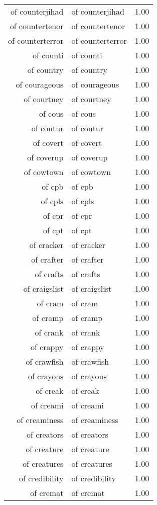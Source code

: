 \begin{table}[ht]
\begin{tabular}{rlr}
  of counterjihad & of counterjihad & 1.00 \\ 
  of countertenor & of countertenor & 1.00 \\ 
  of counterterror & of counterterror & 1.00 \\ 
  of counti & of counti & 1.00 \\ 
  of country & of country & 1.00 \\ 
  of courageous & of courageous & 1.00 \\ 
  of courtney & of courtney & 1.00 \\ 
  of cous & of cous & 1.00 \\ 
  of coutur & of coutur & 1.00 \\ 
  of covert & of covert & 1.00 \\ 
  of coverup & of coverup & 1.00 \\ 
  of cowtown & of cowtown & 1.00 \\ 
  of cpb & of cpb & 1.00 \\ 
  of cpls & of cpls & 1.00 \\ 
  of cpr & of cpr & 1.00 \\ 
  of cpt & of cpt & 1.00 \\ 
  of cracker & of cracker & 1.00 \\ 
  of crafter & of crafter & 1.00 \\ 
  of crafts & of crafts & 1.00 \\ 
  of craigslist & of craigslist & 1.00 \\ 
  of cram & of cram & 1.00 \\ 
  of cramp & of cramp & 1.00 \\ 
  of crank & of crank & 1.00 \\ 
  of crappy & of crappy & 1.00 \\ 
  of crawfish & of crawfish & 1.00 \\ 
  of crayons & of crayons & 1.00 \\ 
  of creak & of creak & 1.00 \\ 
  of creami & of creami & 1.00 \\ 
  of creaminess & of creaminess & 1.00 \\ 
  of creators & of creators & 1.00 \\ 
  of creature & of creature & 1.00 \\ 
  of creatures & of creatures & 1.00 \\ 
  of credibility & of credibility & 1.00 \\ 
  of cremat & of cremat & 1.00 \\ 

\end{tabular}
\end{table}
